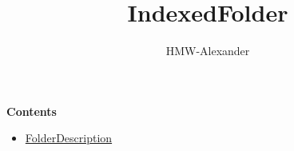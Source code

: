 \documentclass[letterpaper,11pt]{article}
\title{\textbf{IndexedFolder}}
\author{HMW-Alexander}
\begin{document}
\maketitle

\textbf{Contents}
\begin{itemize}
	\item \href{./FolderName/index.html}{FolderDescription}
\end{itemize}
	
\end{document}
